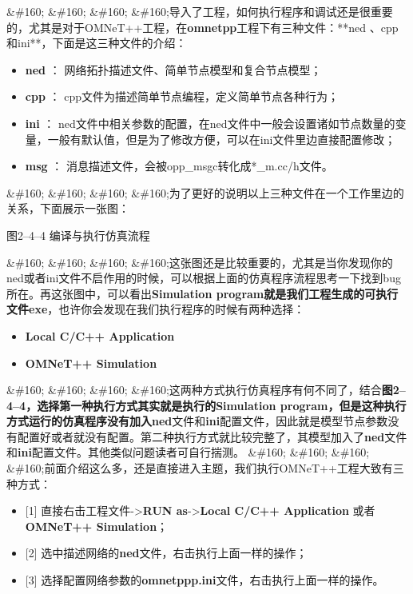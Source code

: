 \&\#160; \&\#160; \&\#160; \&\#160;导入了工程，如何执行程序和调试还是很重要的，尤其是对于OMNeT++工程，在\textbf{omnetpp}工程下有三种文件：**ned 、cpp和ini**，下面是这三种文件的介绍：

\begin{itemize}
\item \textbf{ned} ： 网络拓扑描述文件、简单节点模型和复合节点模型；

\item \textbf{cpp} ： cpp文件为描述简单节点编程，定义简单节点各种行为；

\item \textbf{ini} ： ned文件中相关参数的配置，在ned文件中一般会设置诸如节点数量的变量，一般有默认值，但是为了修改方便，可以在ini文件里边直接配置修改；

\item \textbf{msg} ： 消息描述文件，会被opp\_msgc转化成*\_m.cc\slash h文件。

\end{itemize}

\&\#160; \&\#160; \&\#160; \&\#160;为了更好的说明以上三种文件在一个工作里边的关系，下面展示一张图：

图2--4--4 编译与执行仿真流程

\&\#160; \&\#160; \&\#160; \&\#160;这张图还是比较重要的，尤其是当你发现你的ned或者ini文件不启作用的时候，可以根据上面的仿真程序流程思考一下找到bug所在。再这张图中，可以看出\textbf{Simulation program\textbf{就是我们工程生成的可执行文件}exe}，也许你会发现在我们执行程序的时候有两种选择：

\begin{itemize}
\item \textbf{Local C\slash C++ Application}

\item \textbf{OMNeT++ Simulation}

\end{itemize}

\&\#160; \&\#160; \&\#160; \&\#160;这两种方式执行仿真程序有何不同了，结合\textbf{图2--4--4\textbf{，选择第一种执行方式其实就是执行的}Simulation program\textbf{，但是这种执行方式运行的仿真程序没有加入}ned}文件和\textbf{ini}配置文件，因此就是模型节点参数没有配置好或者就没有配置。第二种执行方式就比较完整了，其模型加入了\textbf{ned}文件和\textbf{ini}配置文件。其他类似问题读者可自行揣测。
\&\#160; \&\#160; \&\#160; \&\#160;前面介绍这么多，还是直接进入主题，我们执行OMNeT++工程大致有三种方式：

\begin{itemize}
\item {[1]} 直接右击工程文件->\textbf{RUN as}->\textbf{Local C\slash C++ Application} 或者\textbf{OMNeT++ Simulation}；

\item {[2]} 选中描述网络的\textbf{ned}文件，右击执行上面一样的操作；

\item {[3]} 选择配置网络参数的\textbf{omnetppp.ini}文件，右击执行上面一样的操作。

\end{itemize}

